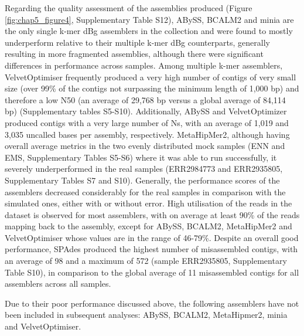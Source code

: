 Regarding the quality assessment of the assemblies produced (Figure \ref{fig:chap5_figure4}, Supplementary Table S12), ABySS, BCALM2 and minia are the only single k-mer \ac{dBg} assemblers in the collection and were found to mostly underperform relative to their multiple k-mer \ac{dBg} counterparts, generally resulting in more fragmented assemblies, although there were significant differences in performance across samples. Among multiple k-mer assemblers, VelvetOptimiser frequently produced a very high number of contigs of very small size (over 99\% of the contigs not surpassing the minimum length of 1,000 \ac{bp}) and therefore a low N50 (an average of 29,768 \ac{bp} versus a global average of 84,114 \ac{bp}) (Supplementary tables S5-S10). Additionally, ABySS and VelvetOptimizer produced contigs with a very large number of Ns, with an average of 1,019 and 3,035 uncalled bases per assembly, respectively. MetaHipMer2, although having overall average metrics in the two evenly distributed mock samples (ENN and EMS, Supplementary Tables S5-S6) where it was able to run successfully, it severely underperformed in the real samples (ERR2984773 and ERR2935805, Supplementary Tables S7 and S10). Generally, the performance scores of the assemblers decreased considerably for the real samples in comparison with the simulated ones, either with or without error. High utilisation of the reads in the dataset is observed for most assemblers, with on average at least 90\% of the reads mapping back to the assembly, except for ABySS, BCALM2, MetaHipMer2 and VelvetOptimiser whose values are in the range of 46-79\%. Despite an overall good performance, SPAdes produced the highest number of misassembled contigs, with an average of 98 and a maximum of 572 (sample ERR2935805, Supplementary Table S10), in comparison to the global average of 11 misassembled contigs for all assemblers across all samples.

Due to their poor performance discussed above, the following assemblers have not been included in subsequent analyses: ABySS, BCALM2, MetaHipmer2, minia and VelvetOptimiser. 

